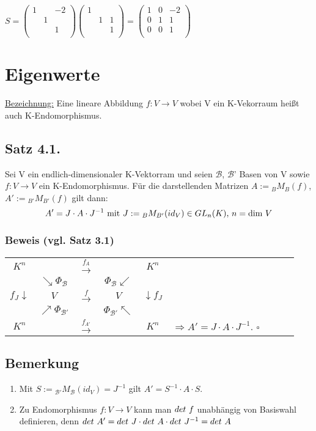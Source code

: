 \documentclass[a4paper,twoside]{article}
\newcommand{\tn}[1]{\textnormal {#1}}
\begin{document}
$S = \left(\begin{matrix} 
1 & & -2 \\
&1  \\
& & 1 \\
\end{matrix} \right)
\left(\begin{matrix} 
1\\
& 1 & 1\\
& & 1\\
\end{matrix} \right) =
\left(\begin{matrix} 
1 & 0 & -2\\
0 & 1 & 1 \\
0 & 0 & 1 \\
\end{matrix} \right)$
\section{Eigenwerte}
\underline{Bezeichnung:} Eine lineare Abbildung $f:V\to V$ wobei V ein K-Vekorraum heißt auch K-Endomorphismus.
\subsection*{Satz 4.1.}
Sei V ein endlich-dimensionaler K-Vektorram und seien $\mathcal B$, $\mathcal B$' Basen von V sowie $f:V\to V$ ein K-Endomorphismus. Für die darstellenden Matrizen $A:={_B}M_B(f)$, $A':={_{B'}}M_{B'}(f)$ gilt dann:
$$
A'= J\cdot A\cdot J^{-1} \tn{ mit } J:={_B}M_{B'}(id_V) \in GL_n(K)\tn{, } n=\tn{dim }V
$$
\subsubsection*{Beweis (vgl. Satz 3.1)}
\begin{tabular}[h]{ccccccccc}
	$K^n$ & & $\xrightarrow{f_A}$ & & $K^n$\\
	& $\searrow \Phi{_\mathcal B}$ & & $\Phi_\mathcal{B} \swarrow$ & \\
	$f_J \downarrow$ & $V$ & $\xrightarrow{f}$ & $V$ & $\downarrow f_J$ \\
	& $\nearrow \Phi_\mathcal{B'}$ & & $\Phi_\mathcal{B'} \nwarrow$ & \\
	$K^n$ & & $\xrightarrow{f_{A'}}$ & & $K^n$ & $\Rightarrow A' = J \cdot A \cdot J^{-1}$. $\square$\\
\end{tabular}
\subsection*{Bemerkung}
\begin{enumerate}[label=(\alph*)]
	\item Mit $S:= {_{\mathcal B'}}M_\mathcal B(id_V) = J^{-1}$ gilt $A'=S^{-1}\cdot A \cdot S$.
	\item Zu Endomorphismus $f:V\to V$ kann man $det\tn{ } f$ unabhängig von Basiswahl definieren, 
	denn $det\tn{ } A' =det\tn{ } J\cdot det\tn{ } A\cdot det\tn{ } J^{-1} = det\tn{ } A$
\end{enumerate}
\end{document}
